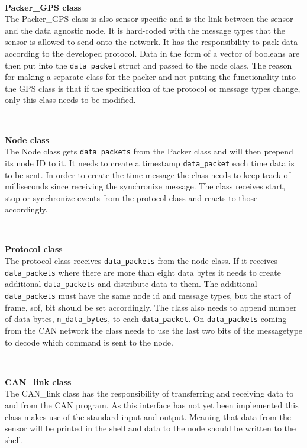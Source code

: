 ~\\ \par \textbf{Packer\_GPS class} ~ \\
The Packer\_GPS class is also sensor specific and is the link between the sensor and the data agnostic node.
It is hard-coded with the message types that the sensor is allowed to send onto the network.
It has the responsibility to pack data according to the developed protocol.
Data in the form of a vector of booleans are then put into the \texttt{data\_packet} struct and passed to the node class.
The reason for making a separate class for the packer and not putting the functionality into the GPS class is that if the specification of the protocol or message types change, only this class needs to be modified.

~\\ \par \textbf{Node class} ~ \\
The Node class gets \texttt{data\_packets} from the Packer class and will then prepend its node ID to it.
It needs to create a timestamp \texttt{data\_packet} each time data is to be sent.
In order to create the time message the class needs to keep track of milliseconds since receiving the synchronize message.
The class receives start, stop or synchronize events from the protocol class and reacts to those accordingly.

~\\ \par \textbf{Protocol class} ~ \\
The protocol class receives \texttt{data\_packets} from the node class. 
If it receives \texttt{data\_packets} where there are more than eight data bytes it needs to create additional \texttt{data\_packets} and distribute data to them. 
The additional \texttt{data\_packets} must have the same node id and message types, but the start of frame, sof, bit should be set accordingly.
The class also needs to append number of data bytes, \texttt{n\_data\_bytes}, to each \texttt{data\_packet}.
On \texttt{data\_packets} coming from the CAN network the class needs to use the last two bits of the messagetype to decode which command is sent to the node.

~\\ \par \textbf{CAN\_link class} ~ \\
The CAN\_link class has the responsibility of transferring and receiving data to and from the CAN program.
As this interface has not yet been implemented this class makes use of the standard input and output. 
Meaning that data from the sensor will be printed in the shell and data to the node should be written to the shell. 

